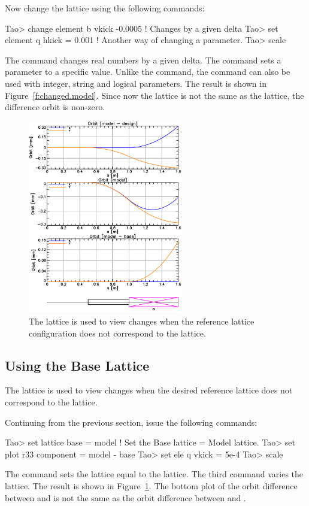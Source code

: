 \documentclass{hitec}     %
\begin{document}
Now change the  lattice using the following commands:
\begin{code}
Tao> change element b vkick  -0.0005   ! Changes by a given delta
Tao> set element q hkick = 0.001       ! Another way of changing a parameter.
Tao> scale
\end{code}
The  command changes real numbers by a given delta. The  command sets a 
parameter to a specific value. Unlike the  command, 
the  command can also be used with integer, string and logical
parameters.  The result is shown in Figure~\ref{f:changed.model}. Since now
the  lattice is not the same as the  lattice, the difference orbit is non-zero.

\begin{figure}[tb]
  \centering
  \includegraphics[width=0.6\textwidth]{with-base.pdf}
  \caption{The  lattice is used to view changes when the reference lattice configuration
does not correspond to the  lattice.}
  \label{f:base}
\end{figure}

\subsection{Using the Base Lattice}

The  lattice is used to view changes when the desired reference lattice does not
correspond to the  lattice.

Continuing from the previous section, issue the following commands:
\begin{code}
Tao> set lattice base = model  ! Set the Base lattice = Model lattice.
Tao> set plot r33 component = model - base
Tao> set ele q vkick = 5e-4
Tao> scale
\end{code} 
The  command sets the  lattice equal to the 
lattice. The third command varies the  lattice.  The result is shown in
Figure~\ref{f:base}. The bottom plot of the orbit difference between  and
 is not the same as the orbit difference between  and .
\end{document}
